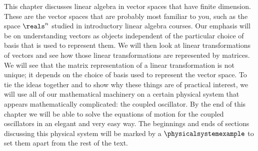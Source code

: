 
This chapter discusses linear algebra in vector spaces that have finite dimension.
These are the vector spaces that are probably most familiar to you, such as the space $\reals^{n}$ studied in introductory linear algebra courses.
Our emphasis will be on understanding vectors as objects independent of the particular choice of basis that is used to represent them.
We will then look at linear transformations of vectors and see how those linear transformations are represented by matrices.
We will see that the matrix representation of a linear transformation is not unique; it depends on the choice of basis used to represent the vector space.
To tie the ideas together and to show why these things are of practical interest, we will use all of our mathematical machinery on a certain physical system that appears mathematically complicated: the coupled oscillator.
By the end of this chapter we will be able to solve the equations of motion for the coupled oscillators in an elegant and very easy way.
The beginnings and ends of sections discussing this physical system will be marked by a $\physicalsystemexample$ to set them apart from the rest of the text.

